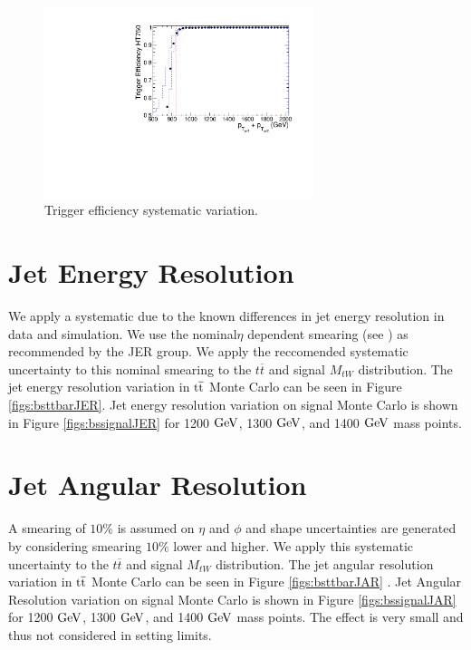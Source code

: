 \begin{figure}[htcb]
\begin{center}
\includegraphics[width=0.7\textwidth]{AN-14-049/figs/Trigger_Comparison_Htdijet_dataonly_withsyst}
\caption{
Trigger efficiency systematic variation. 
}
\label{figs:bsteffsys}
\end{center}
\end{figure}


\section{Jet Energy Resolution}
\label{sec:bsJER}
We apply a systematic due to the known differences in jet energy resolution in data and simulation.  We use the nominal$\eta$ dependent smearing (see \cite{ZP8TeV}) as recommended by the JER group.  
We apply the reccomended systematic uncertainty to this nominal smearing to the $t\overline{t}$ and signal $M_{tW}$ distribution. 
The jet energy resolution variation in $\mathrm{t\overline{t}}$ Monte Carlo can be seen in Figure \ref{figs:bsttbarJER}.  Jet energy resolution variation on signal Monte Carlo is shown in Figure \ref{figs:bssignalJER} for 1200$~\mathrm{GeV}$,
 1300$~\mathrm{GeV}$, and 1400$~\mathrm{GeV}$ mass points. 

\section{Jet Angular Resolution}
A smearing of $10\%$ is assumed on $\eta$ and $\phi$ and shape uncertainties are generated by considering smearing $10\%$ 
lower and higher. We apply this systematic uncertainty to the $t\overline{t}$ and signal $M_{tW}$ distribution.  The jet angular resolution variation in $\mathrm{t\overline{t}}$ Monte Carlo can be seen in Figure \ref{figs:bsttbarJAR} . Jet Angular Resolution 
variation on signal Monte Carlo is shown in Figure \ref{figs:bssignalJAR} for 1200$~\mathrm{GeV}$,
 1300$~\mathrm{GeV}$, and 1400$~\mathrm{GeV}$ mass points.  The effect is very small and thus not considered in setting limits.

